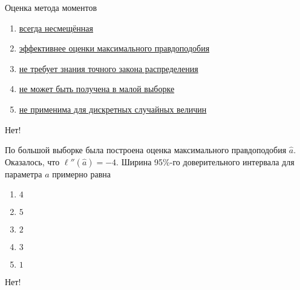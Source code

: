 \documentclass[t]{beamer}
\begin{document}
 \begin{frame} \label{16-No} 
\begin{block}{16} 

  Оценка метода моментов


 \end{block} 
\begin{enumerate} 
\item[] \hyperlink{16-No}{\beamergotobutton{} всегда несмещённая}
\item[] \hyperlink{16-No}{\beamergotobutton{} эффективнее оценки максимального правдоподобия}
\item[] \hyperlink{16-Yes}{\beamergotobutton{} не требует знания точного закона распределения}
\item[] \hyperlink{16-No}{\beamergotobutton{} не может быть получена в малой выборке}
\item[] \hyperlink{16-No}{\beamergotobutton{} не применима для дискретных случайных величин}
\end{enumerate} 

 \alert{Нет!} 
\end{frame} 


 \begin{frame} \label{17-No} 
\begin{block}{17} 

   По большой выборке была построена оценка  максимального правдоподобия $\hat a$. Оказалось, что $\ell''(\hat a) = -4$. Ширина 95\%-го доверительного интервала для параметра $a$ примерно равна


 \end{block} 
\begin{enumerate} 
\item[] \hyperlink{17-No}{\beamergotobutton{} $4$}
\item[] \hyperlink{17-No}{\beamergotobutton{} $5$}
\item[] \hyperlink{17-Yes}{\beamergotobutton{} $2$}
\item[] \hyperlink{17-No}{\beamergotobutton{} $3$}
\item[] \hyperlink{17-No}{\beamergotobutton{} $1$}
\end{enumerate} 

 \alert{Нет!} 
\end{frame} 
\end{document}
